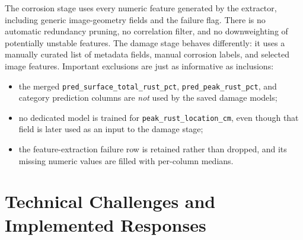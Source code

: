 \documentclass[11pt,a4paper]{article}
\begin{document}
The corrosion stage uses every numeric feature generated by the extractor, including generic image-geometry fields and the failure flag. There is no automatic redundancy pruning, no correlation filter, and no downweighting of potentially unstable features. The damage stage behaves differently: it uses a manually curated list of metadata fields, manual corrosion labels, and selected image features. Important exclusions are just as informative as inclusions:
\begin{itemize}
  \item the merged \texttt{pred\_surface\_total\_rust\_pct}, \texttt{pred\_peak\_rust\_pct}, and category prediction columns are \emph{not} used by the saved damage models;
  \item no dedicated model is trained for \texttt{peak\_rust\_location\_cm}, even though that field is later used as an input to the damage stage;
  \item the feature-extraction failure row is retained rather than dropped, and its missing numeric values are filled with per-column medians.
\end{itemize}

\section{Technical Challenges and Implemented Responses}
\end{document}
